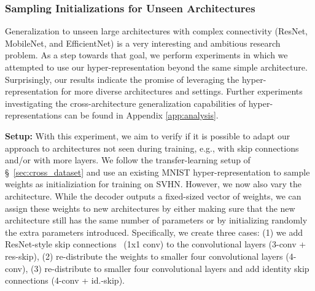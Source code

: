 \documentclass{article}
\begin{document}
\subsubsection{Sampling Initializations for Unseen Architectures}
Generalization to unseen large architectures with complex connectivity (ResNet, MobileNet, and EfficientNet) is a very interesting and ambitious research problem. As a step towards that goal, we perform experiments in which we attempted to use our hyper-representation beyond the same simple architecture. Surprisingly, our results indicate the promise of leveraging the hyper-representation for more diverse architectures and settings. 
Further experiments investigating the cross-architecture generalization capabilities of hyper-representations can be found in Appendix \ref{app:analysis}. 

\textbf{Setup:} With this experiment, we aim to verify if it is possible to adapt our approach to architectures not seen during training, e.g., with skip connections and/or with more layers. We follow the transfer-learning setup of \S~\ref{sec:cross_dataset} and use an existing MNIST hyper-representation to sample weights as initializiation for training on SVHN. However, we now also vary the architecture. 
While the decoder outputs a fixed-sized vector of weights, we can assign these weights to new architectures by either making sure that the new architecture still has the same number of parameters or by initializing randomly the extra parameters introduced. 
Specifically, we create three cases: (1) we add ResNet-style skip connections~\citep{heDeepResidualLearning2016} (1x1 conv) to the convolutional layers (3-conv + res-skip), (2) re-distribute the weights to smaller four convolutional layers (4-conv), (3) re-distribute to smaller four convolutional layers and add identity skip connections (4-conv + id.-skip).
\end{document}
